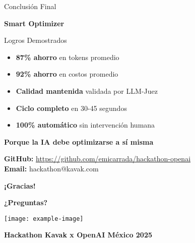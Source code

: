 \documentclass[aspectratio=169,11pt]{beamer}
\begin{document}
\begin{frame}{Conclusión Final}
\begin{center}
\LARGE \textbf{Smart Optimizer}
\end{center}

\vspace{0.3cm}

\begin{exampleblock}{Logros Demostrados}
\begin{itemize}
    \item \textcolor{kavakgreen}{\textbf{87\% ahorro}} en tokens promedio
    \item \textcolor{kavakgreen}{\textbf{92\% ahorro}} en costos promedio
    \item \textcolor{kavakgreen}{\textbf{Calidad mantenida}} validada por LLM-Juez
    \item \textcolor{kavakgreen}{\textbf{Ciclo completo}} en 30-45 segundos
    \item \textcolor{kavakgreen}{\textbf{100\% automático}} sin intervención humana
\end{itemize}
\end{exampleblock}

\vspace{0.3cm}

\begin{center}
\Large \textbf{Porque la IA debe optimizarse a sí misma}
\end{center}

\vspace{0.5cm}

\begin{center}
\footnotesize
\textbf{GitHub:} \url{https://github.com/emicarrada/hackathon-openai} \\
\textbf{Email:} hackathon@kavak.com
\end{center}
\end{frame}

\begin{frame}[plain]
\begin{center}
\Huge \textbf{¡Gracias!}

\vspace{1cm}

\Large \textbf{¿Preguntas?}

\vspace{1cm}

\texttt{[image: example-image]} %

\vspace{0.5cm}

\normalsize
\textbf{Hackathon Kavak x OpenAI México 2025}
\end{center}
\end{frame}
\end{document}
